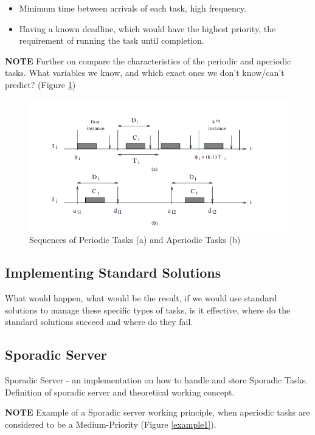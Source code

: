 \documentclass[conference]{IEEEtran}
\begin{document}
\begin{itemize}
    \item Minimum time between arrivals of each task, high frequency.
    \item Having a known deadline, which would have the highest priority, the requirement of running the task until completion.
\end{itemize}

\textbf{NOTE} Further on compare the characteristics of the periodic and aperiodic tasks. What variables we know, and which exact ones we don't know/can't predict? (Figure \ref{tasks})

\begin{figure}[htbp]
\centerline{\includegraphics[scale=.5]{Tasks.png}}
\caption{Sequences of Periodic Tasks (a) and Aperiodic Tasks (b)}
\label{tasks}
\end{figure}

\subsection{Implementing Standard Solutions}
What would happen, what would be the result, if we would use standard solutions to manage these specific types of tasks, is it effective, where do the standard solutions succeed and where do they fail.

\subsection{Sporadic Server}
Sporadic Server - an implementation on how to handle and store Sporadic Tasks.
Definition of sporadic server and theoretical working concept.

\textbf{NOTE} Example of a Sporadic server working principle, when aperiodic tasks are considered to be a Medium-Priority (Figure \ref{example1}).
\end{document}
